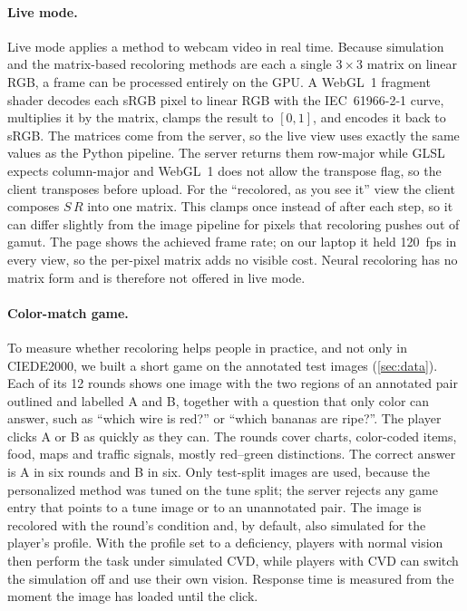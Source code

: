 \paragraph{Live mode.}
Live mode applies a method to webcam video in real time. Because simulation and the
matrix-based recoloring methods are each a single $3{\times}3$ matrix on linear RGB, a frame
can be processed entirely on the GPU. A WebGL~1 fragment shader decodes each sRGB pixel to
linear RGB with the IEC~61966-2-1 curve, multiplies it by the matrix, clamps the result to
$[0,1]$, and encodes it back to sRGB. The matrices come from the server, so the live view uses
exactly the same values as the Python pipeline. The server returns them row-major while GLSL
expects column-major and WebGL~1 does not allow the transpose flag, so the client transposes
before upload. For the ``recolored, as you see it'' view the client composes $S\,R$ into one
matrix. This clamps once instead of after each step, so it can differ slightly from the image
pipeline for pixels that recoloring pushes out of gamut. The page shows the achieved frame rate;
on our laptop it held 120~fps in every view, so the per-pixel matrix adds no visible cost.
Neural recoloring has no matrix form and is therefore not offered in live mode.

\paragraph{Color-match game.}
To measure whether recoloring helps people in practice, and not only in CIEDE2000, we built a
short game on the annotated test images (\cref{sec:data}). Each of its 12 rounds shows one
image with the two regions of an annotated pair outlined and labelled A and B, together with a
question that only color can answer, such as ``which wire is red?'' or ``which bananas are
ripe?''. The player clicks A or B as quickly as they can. The rounds cover charts, color-coded
items, food, maps and traffic signals, mostly red--green distinctions. The correct answer is A
in six rounds and B in six. Only test-split images are used, because the personalized method
was tuned on the tune split; the server rejects any game entry that points to a tune image or
to an unannotated pair. The image is recolored with the round's condition and, by default,
also simulated for the player's profile. With the profile set to a deficiency, players with
normal vision then perform the task under simulated CVD, while players with CVD can switch the
simulation off and use their own vision. Response time is measured from the moment the image
has loaded until the click.

